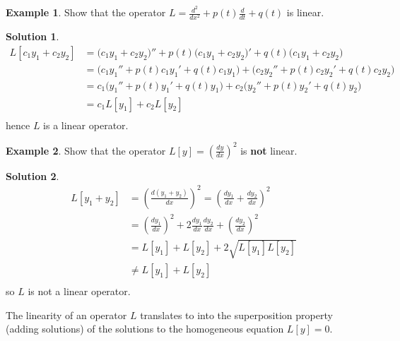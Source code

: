 \documentclass{article}
\theoremstyle{plain}
\theoremstyle{definition}
\newtheorem{exmp}{Example}[section]
\newtheorem*{sol}{Solution}
\numberwithin{equation}{section}
\begin{document}
\begin{tcolorbox}
\begin{exmp}
    Show that the operator $L = \frac{d^2}{dx^2} + p(t)\frac{d}{dt} + q(t)$ is linear.
\end{exmp}
\begin{sol}
    \begin{align*}
        L[c_1y_1 + c_2y_2] &= \big(c_1y_1 + c_2y_2\big)'' + p(t)\big(c_1y_1 + c_2y_2\big)' + q(t)\big(c_1y_1 + c_2y_2\big) \\
        &= \big(c_1y_1''+p(t)c_1y_1' + q(t)c_1y_1\big) + \big(c_2y_2'' + p(t)c_2y_2' + q(t)c_2y_2\big)\\
        &= c_1 \big( y_1'' + p(t)y_1' + q(t)y_1 \big) + c_2 \big( y_2'' + p(t)y_2' + q(t)y_2 \big) \\
        &= c_1 L[y_1] + c_2 L[y_2] \\
    \end{align*}
    hence $L$ is a linear operator.
\end{sol}

\end{tcolorbox}
\begin{tcolorbox}

\begin{exmp}
    Show that the operator $L[y] = \left(\frac{dy}{dx}\right)^2$ is \textbf{not} linear.
\end{exmp}
\begin{sol}
    \begin{align*}
        L[y_1 + y_2] &= \left(\frac{d(y_1 + y_2)}{dx}\right)^2 = \left( \frac{dy_1}{dx} + \frac{dy_2}{dx} \right)^2 \\
        &= \left(\frac{dy_1}{dx}\right)^2 + 2\frac{dy_1}{dx}\frac{dy_2}{dx} + \left( \frac{dy_2}{dx} \right)^2 \\
        &= L[y_1] + L[y_2] + 2\sqrt{L[y_1]L[y_2]} \\
        & \neq L[y_1] + L[y_2] \\
    \end{align*}
    so $L$ is not a linear operator.
\end{sol}
\end{tcolorbox}
\bigskip
The linearity of an operator $L$ translates to into the superposition property (adding solutions) of the solutions to the homogeneous equation $L[y] = 0$.
\end{document}
